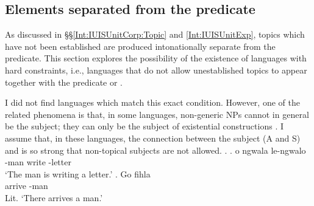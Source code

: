 %


\subsection{Elements separated from the predicate}\label{Disc:HardConst:Separated}

As discussed in \S\S \ref{Int:IUISUnitCorp:Topic} and \ref{Int:IUISUnitExp},
topics which have not been established are produced intonationally separate from the predicate.
This section explores the possibility of the existence of
languages with hard constraints,
i.e., languages that do not allow unestablished topics to appear together with the predicate or .

I did not find languages which match this exact condition.
However, one of the related phenomena is that, in some languages,
 non-generic NPs cannot in general be the subject;
they can only be the subject of existential constructions \cite[173ff.]{givon76}.
I assume that, in these languages,
the connection between the subject (A and S) and  is so strong
that non-topical subjects are not allowed.
%
\ex.
 \ag.  o ngwala le-ngwalo \\
      -man  write -letter \\
      `The man is writing a letter.'
 \bg. Go fihla  \\
       arrive -man \\
      Lit. `There arrives a man.'
     \hfill{\cite[171]{zerbian06}}

